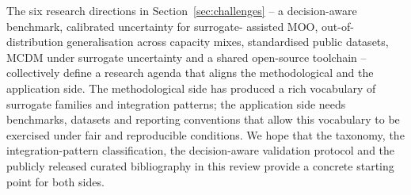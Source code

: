 The six research directions in Section~\ref{sec:challenges} -- a
decision-aware benchmark, calibrated uncertainty for surrogate-
assisted MOO, out-of-distribution generalisation across capacity
mixes, standardised public datasets, MCDM under surrogate
uncertainty and a shared open-source toolchain -- collectively define
a research agenda that aligns the methodological and the application
side. The methodological side has produced a rich vocabulary of
surrogate families and integration patterns; the application side
needs benchmarks, datasets and reporting conventions that allow
this vocabulary to be exercised under fair and reproducible
conditions. We hope that the taxonomy, the integration-pattern
classification, the decision-aware validation protocol and the
publicly released curated bibliography in this review provide a
concrete starting point for both sides.
